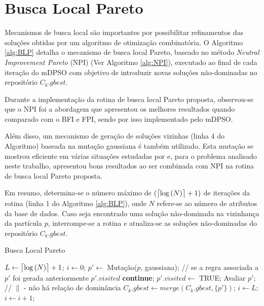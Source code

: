\documentclass[
	12pt,				%
	openany,			%
	oneside,	
	a4paper,			%
	brazil,				%
	]{unimontes-ppgmsc-abntex2}
\DeclarePairedDelimiter{\ceil}{\lceil}{\rceil}
\begin{document}
\section{Busca Local Pareto}
\label{sec:mdpso_busca_local}

Mecanismos de busca local são importantes por possibilitar refinamentos das soluções obtidas por um algoritmo de otimização combinatória. O Algoritmo \ref{alg:BLP} detalha o mecanismo de busca local Pareto, baseado no método {\em Neutral Improvement Pareto} (NPI) (Ver Algoritmo \ref{alg:NPI}), executado ao final de cada iteração do mDPSO com objetivo de introduzir novas soluções não-dominadas no repositório $C_k.gbest$. 

Durante a implementação da rotina de busca local Pareto proposta, observou-se que o NPI foi a abordagem que apresentou os melhores resultados quando comparado com o BFI e FPI, sendo por isso implementado pelo mDPSO. 

Além disso, um mecanismo de geração de soluções vizinhas (linha 4 do Algoritmo) baseada na mutação gaussiana é também utilizado. Esta mutação se mostrou eficiente em várias situações estudadas por  e, para o problema analisado neste trabalho, apresentou bons resultados ao ser combinada com NPI na rotina de busca local Pareto proposta.  

Em resumo, determina-se o número máximo de $(\ceil[\big]{\log{(N)}} + 1)$ de iterações da rotina (linha 1 do Algoritmo \ref{alg:BLP}), onde $N$ refere-se ao número de atributos da base de dados. Caso seja encontrado uma solução não-dominada na vizinhança da partícula $p$, interrompe-se a rotina e atualiza-se as soluções não-dominadas do repositório $C_k.gbest$.

\begin{algorithm}[ht]
\caption{Busca Local Pareto}
\label{alg:BLP}
\begin{algorithmic}[1]
\State $L \leftarrow \ceil[\big]{\log{(N)}} + 1$;
\State $i \leftarrow 0$;
  \State $p' \leftarrow $ Mutação($p$, gaussiana);
  \State // se a regra associada a $p'$ foi gerada anteriormente $p'.visited$
    \State \textbf{continue};
  \EndIf
  \State $p'.visited \leftarrow$ TRUE;
  \State Avaliar $p'$;
   // $\parallel$ - \small{não há relação de dominância}
  	\State $C_k.gbest \leftarrow merge(C_k.gbest, \{p'\})$;
    \State $i \leftarrow L$;
  \EndIf
  \State $i \leftarrow i + 1$;
\EndWhile
\end{algorithmic}
\end{algorithm}
\end{document}
